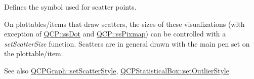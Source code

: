 Defines the symbol used for scatter points. 

On plottables/items that draw scatters, the sizes of these visualizations (with exception of \hyperlink{a00143_af66d0711d42fe78d96c28abadc67f26fa56816c1386f1356417bcc013adf0367c}{Q\+C\+P\+::ss\+Dot} and \hyperlink{a00143_af66d0711d42fe78d96c28abadc67f26fa3046d385199d0903dd492322ba133e75}{Q\+C\+P\+::ss\+Pixmap}) can be controlled with a {\itshape set\+Scatter\+Size} function. Scatters are in general drawn with the main pen set on the plottable/item.

\begin{DoxySeeAlso}{See also}
\hyperlink{a00031_a06373e09547bcfe237dd8ebcbe5c255a}{Q\+C\+P\+Graph\+::set\+Scatter\+Style}, \hyperlink{a00050_a1cb2469552f6f6615b1f6d7398463e5c}{Q\+C\+P\+Statistical\+Box\+::set\+Outlier\+Style} 
\end{DoxySeeAlso}
